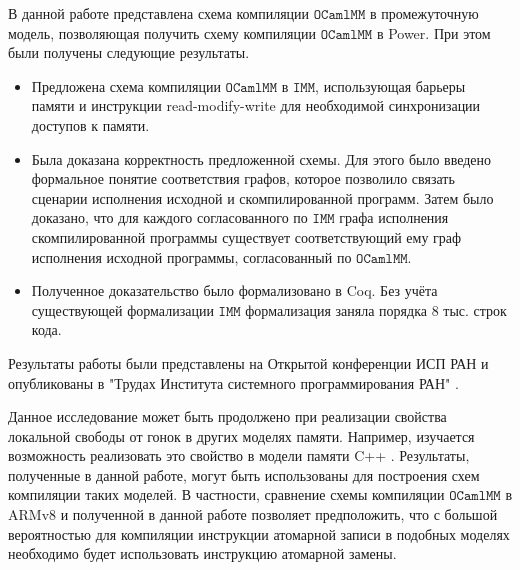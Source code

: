 \documentclass[14pt]{matmex-diploma-custom}
\newcommand{\IMM}{\mathtt{IMM}}
\newcommand{\OMM}{\mathtt{OCaml}\allowbreak \mathtt{MM}}
\begin{document}
В данной работе представлена схема компиляции $\OMM$ в промежуточную модель, позволяющая получить схему компиляции $\OMM$ в Power. При этом были получены следующие результаты.

\begin{itemize}
\item Предложена схема компиляции $\OMM$ в $\IMM$, использующая барьеры памяти и инструкции read-modify-write для необходимой синхронизации доступов к памяти. 
\item Была доказана корректность предложенной схемы. Для этого было введено формальное понятие соответствия графов, которое позволило связать сценарии исполнения исходной и скомпилированной программ. Затем было доказано, что для каждого согласованного по $\IMM$ графа исполнения скомпилированной программы существует соответствующий ему граф исполнения исходной программы, согласованный по $\OMM$. 
\item Полученное доказательство было формализовано в Coq. Без учёта существующей формализации $\IMM$ формализация заняла порядка 8 тыс. строк кода. 
\end{itemize}

Результаты работы были представлены на Открытой конференции ИСП РАН и опубликованы в "Трудах Института системного программирования РАН" \cite{publication}. 

Данное исследование может быть продолжено при реализации свойства локальной свободы от гонок в других моделях памяти. Например, изучается возможность реализовать это свойство в модели памяти C++ \cite{ldrf-c11}. Результаты, полученные в данной работе, могут быть использованы для построения схем компиляции таких моделей. В частности, сравнение схемы компиляции $\OMM$ в ARMv8 \cite{omm} и полученной в данной работе позволяет предположить, что с большой вероятностью для компиляции инструкции атомарной записи в подобных моделях необходимо будет использовать инструкцию атомарной замены.

\printbibliography
\end{document}
